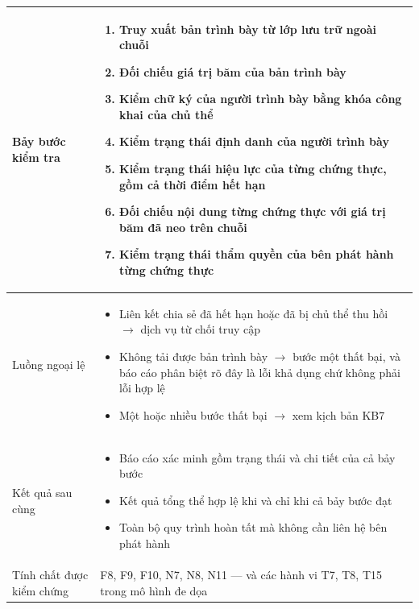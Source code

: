 \begin{longtable}{|p{3.4cm}|p{10.3cm}|}
Bảy bước kiểm tra &
\begin{enumerate}[leftmargin=*, nosep]
    \item Truy xuất bản trình bày từ lớp lưu trữ ngoài chuỗi
    \item Đối chiếu giá trị băm của bản trình bày
    \item Kiểm chữ ký của người trình bày bằng khóa công khai của chủ thể
    \item Kiểm trạng thái định danh của người trình bày
    \item Kiểm trạng thái hiệu lực của từng chứng thực, gồm cả thời điểm hết hạn
    \item Đối chiếu nội dung từng chứng thực với giá trị băm đã neo trên chuỗi
    \item Kiểm trạng thái thẩm quyền của bên phát hành từng chứng thực
\end{enumerate} \\
\hline

Luồng ngoại lệ &
\begin{itemize}[leftmargin=*, nosep]
    \item Liên kết chia sẻ đã hết hạn hoặc đã bị chủ thể thu hồi $\rightarrow$ dịch vụ từ chối truy cập
    \item Không tải được bản trình bày $\rightarrow$ bước một thất bại, và báo cáo phân biệt rõ đây là lỗi khả dụng chứ không phải lỗi hợp lệ
    \item Một hoặc nhiều bước thất bại $\rightarrow$ xem kịch bản KB7
\end{itemize} \\
\hline

Kết quả sau cùng &
\begin{itemize}[leftmargin=*, nosep]
    \item Báo cáo xác minh gồm trạng thái và chi tiết của cả bảy bước
    \item Kết quả tổng thể hợp lệ khi và chỉ khi cả bảy bước đạt
    \item Toàn bộ quy trình hoàn tất mà không cần liên hệ bên phát hành
\end{itemize} \\
\hline

Tính chất được kiểm chứng &
F8, F9, F10, N7, N8, N11 --- và các hành vi T7, T8, T15 trong mô hình đe dọa \\
\hline

\end{longtable}

